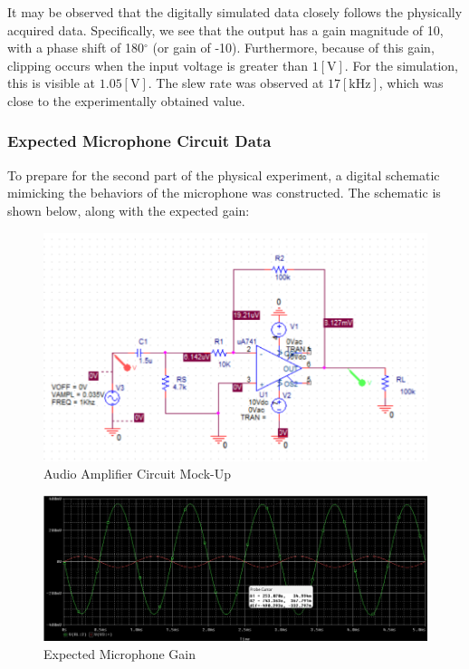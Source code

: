\documentclass[
	letterpaper, %
	10pt, %
]{CSUniSchoolLabReport}
\begin{document}
It may be observed that the digitally simulated data closely follows the physically acquired data. Specifically, we see that the output has a gain magnitude of 10, with a phase shift of 180$^{\circ}$ (or gain of -10). Furthermore, because of this gain, clipping occurs when the input voltage is greater than $1[\si{\volt}]$. For the simulation, this is visible at $1.05[\si{\volt}]$. The slew rate was observed at $17[\si{\kilo\hertz}]$, which was close to the experimentally obtained value.

\subsubsection{Expected Microphone Circuit Data}

To prepare for the second part of the physical experiment, a digital schematic mimicking the behaviors of the microphone was constructed. The schematic is shown below, along with the expected gain:

\begin{figure}[H]
  \centering
  \includegraphics[width=.9\textwidth]{Figures/L1Schematic2.png}
  \caption{Audio Amplifier Circuit Mock-Up}
  \label{fig:12}
\end{figure}

\begin{figure}[H]
  \centering
  \includegraphics[width=.9\textwidth]{Figures/L1D4.png}
  \caption{Expected Microphone Gain}
  \label{fig:13}
\end{figure}
\end{document}
